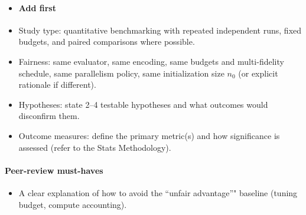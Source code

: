\begin{itemize}
    \item \paragraph{Add first}
\end{itemize}
\begin{itemize}
  \begin{itemize}
      \item Study type: quantitative benchmarking with repeated independent runs, fixed budgets, and paired comparisons where possible.
      \item Fairness: same evaluator, same encoding, same budgets and multi-fidelity schedule, same parallelism policy, same initialization size $n_0$ (or explicit rationale if different).
      \item Hypotheses: state 2--4 testable hypotheses and what outcomes would disconfirm them.
      \item Outcome measures: define the primary metric(s) and how significance is assessed (refer to the Stats Methodology).
  \end{itemize}
\end{itemize}

\paragraph{Peer-review must-haves}
\begin{itemize}
  \item A clear explanation of how to avoid the “unfair advantage”" baseline (tuning budget, compute accounting).
\end{itemize}
